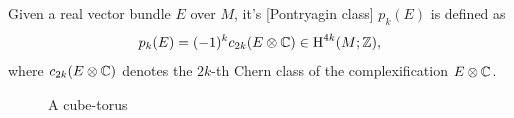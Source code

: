 \begin{definition}\label{def:pontryagin-og}
	Given a real vector bundle $E$ over $M$, it's [Pontryagin class] $p_k(E)$ is defined as
	\[
		p_k(E) = (-1)^k c_{2k}(E\otimes \mathbb{C}) \in \operatorname{H}^{4k}(M; \mathbb{Z}),
	\]
	where $c_{2k}(E\otimes \mathbb{C})$ denotes the $2k$-th Chern class of the complexification $E\otimes \mathbb{C}$.
\end{definition}
\lipsum[2]

\begin{figure}\label{fig:cube-torus}
  \setlength{\belowcaptionskip}{0em}
	\centering
	\caption{A cube-torus}
\end{figure}

\lipsum[4-5]

